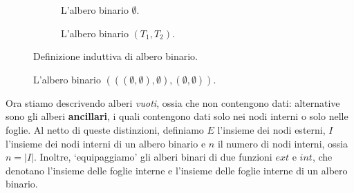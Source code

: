 \begin{figure}[!hb]
	\begin{subfigure}{0.45\textwidth}
		\begin{center}
		\end{center}
		\caption{L'albero binario $\emptyset$.}
	\end{subfigure}
	\begin{subfigure}{0.45\textwidth}
		\begin{center}
		\end{center}
		\caption{L'albero binario $(T_1, T_2)$.}
	\end{subfigure}
	\caption{Definizione induttiva di albero binario.}
	\label{fig:btree_inductive}
\end{figure}

\begin{figure}
	\begin{center}
	\end{center}
	\caption{L'albero binario $(((\emptyset, \emptyset), \emptyset), (\emptyset, \emptyset))$.}
	\label{fig:btree_example}
\end{figure}

\noindent
Ora stiamo descrivendo alberi \textit{vuoti}, ossia che non contengono dati:
alternative sono gli alberi \textbf{ancillari}, i quali contengono dati solo nei nodi interni
o solo nelle foglie. Al netto di queste distinzioni, definiamo $E$ l'insieme dei nodi
esterni, $I$ l'insieme dei nodi interni di un albero binario e $n$ il numero di nodi
interni, ossia $n = |I|$. Inoltre, `equipaggiamo' gli alberi binari di due funzioni
$ext$ e $int$, che denotano l'insieme delle foglie interne e l'insieme delle foglie
interne di un albero binario.

